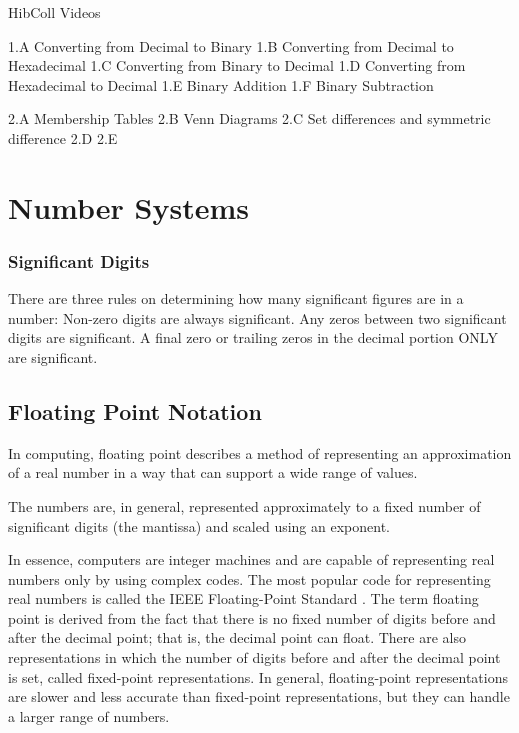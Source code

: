 \documentclass[]{report}
\begin{document}
HibColl Videos


1.A  Converting from Decimal to Binary
1.B  Converting from Decimal to Hexadecimal
1.C  Converting from Binary to Decimal
1.D  Converting from Hexadecimal to Decimal
1.E  Binary Addition
1.F  Binary Subtraction


2.A  Membership Tables
2.B  Venn Diagrams
2.C  Set differences and symmetric difference
2.D  
2.E



\chapter{Number Systems}
\subsection{Significant Digits}
There are three rules on determining how many significant figures are in a number: Non-zero digits are always significant. Any zeros between two significant digits are significant. A final zero or trailing zeros in the decimal portion ONLY are significant.

\section{Floating Point Notation}



In computing, floating point describes a method of 
representing an approximation of a real number in a 
way that can support a wide range of values. 


The numbers are, in general, represented approximately 
to a fixed number of significant digits (the mantissa) and scaled using an exponent. 

In essence, computers are integer machines and are capable of representing real numbers only by using complex codes. The most popular code for representing real numbers is called the IEEE Floating-Point Standard .
The term floating point is derived from the fact that there is no fixed number of digits before and after the decimal point; that is, the decimal point can float. There are also representations in 
which the number of digits before and after the decimal point is set, called fixed-point representations. In general, floating-point representations are slower and less accurate than fixed-point representations, but they can handle a larger range of numbers.
\end{document}
